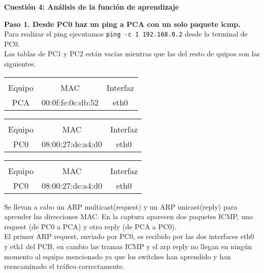 \documentclass[a4paper,12pt,twoside]{article}
\begin{document}
{\bf Cuestión 4: Análisis de la función de aprendizaje}\vspace{0.5cm}

{\bf Paso 1. Desde PC0 haz un ping a PCA con un solo paquete icmp.}\\
Para realizar el ping ejecutamos {\tt ping -c 1 192.168.0.2} desde la terminal de PC0.\\
Las tablas de PC1 y PC2 están vacías mientras que las del resto de quipos son las siguientes.

\begin{minipage}[l]{0.45\linewidth}
\centering
\begin{tabular}{c c c} 
\rowcolor{SkyBlue}\multicolumn{3}{c}{\textbf{ARP PC0}}\\
\rowcolor{SkyBlue}Equipo & MAC & Interfaz\\\hline
PCA & 00:0f:fe:0c:db:52 & eth0\\\hline
\end{tabular}
\end{minipage}
\begin{minipage}[c]{0.45\linewidth}
\centering
\begin{tabular}{c c c} 
\rowcolor{SkyBlue}\multicolumn{3}{c}{\textbf{ARP PCA}}\\
\rowcolor{SkyBlue}Equipo & MAC & Interfaz\\\hline
PC0 & 08:00:27:de:a4:d0 & eth0\\\hline
\end{tabular}
\end{minipage}\vspace{0.1cm}


\begin{minipage}[r]{0.45\linewidth}
\centering
\begin{tabular}{c c c} 
\rowcolor{SkyBlue}\multicolumn{3}{c}{\textbf{ARP PCB0}}\\
\rowcolor{SkyBlue}Equipo & MAC & Interfaz\\\hline
PC0 & 08:00:27:de:a4:d0 & eth0\\\hline
\end{tabular}
\end{minipage}\vspace{0.4cm}


Se llevan a cabo un ARP multicast(request) y un ARP unicast(reply) para aprender las direcciones MAC. En la captura aparecen dos paquetes ICMP, uno request (de PC0 a PCA) y otro reply (de PCA a PC0).\\
El primer ARP request, enviado por PC0, es recibido por las dos interfaces eth0 y eth1 del PCB, en cambio las tramas ICMP y el arp reply no llegan en ningún momento al equipo mencionado ya que los switches han aprendido y han reencaminado el tráfico correctamente.\vspace{0.5cm}
\end{document}
